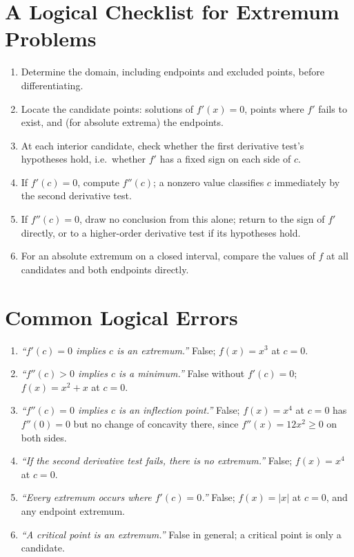 \documentclass{essay}
\begin{document}
\section{A Logical Checklist for Extremum Problems}

\begin{enumerate}
  \item Determine the domain, including endpoints and excluded points,
    before differentiating.
  \item Locate the candidate points: solutions of \(f'(x)=0\), points
    where \(f'\) fails to exist, and (for absolute extrema) the endpoints.
  \item At each interior candidate, check whether the first derivative
    test's hypotheses hold, i.e.\ whether \(f'\) has a fixed sign on each
    side of \(c\).
  \item If \(f'(c)=0\), compute \(f''(c)\); a nonzero value classifies
    \(c\) immediately by the second derivative test.
  \item If \(f''(c)=0\), draw no conclusion from this alone; return to
    the sign of \(f'\) directly, or to a higher-order derivative test if
    its hypotheses hold.
  \item For an absolute extremum on a closed interval, compare the
    values of \(f\) at all candidates and both endpoints directly.
\end{enumerate}

\section{Common Logical Errors}

\begin{enumerate}
  \item \emph{``\(f'(c)=0\) implies \(c\) is an extremum.''} False;
    \(f(x)=x^{3}\) at \(c=0\).
  \item \emph{``\(f''(c)>0\) implies \(c\) is a minimum.''} False without
    \(f'(c)=0\); \(f(x)=x^{2}+x\) at \(c=0\).
  \item \emph{``\(f''(c)=0\) implies \(c\) is an inflection point.''}
    False; \(f(x)=x^{4}\) at \(c=0\) has \(f''(0)=0\) but no change of
    concavity there, since \(f''(x)=12x^{2}\geq0\) on both sides.
  \item \emph{``If the second derivative test fails, there is no
    extremum.''} False; \(f(x)=x^{4}\) at \(c=0\).
  \item \emph{``Every extremum occurs where \(f'(c)=0\).''} False;
    \(f(x)=|x|\) at \(c=0\), and any endpoint extremum.
  \item \emph{``A critical point is an extremum.''} False in general; a
    critical point is only a candidate.
\end{enumerate}
\end{document}
